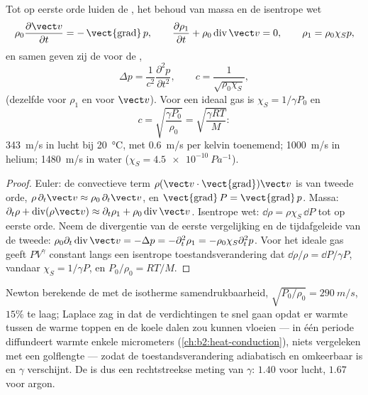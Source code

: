 \begin{theorem}[Geluidsgolven]\label{thm:b2:sound-waves:equation}
Tot op eerste orde luiden de , het behoud van massa en
de isentrope wet
\[
\rho_0\frac{\partial\vect v}{\partial t} = -\operatorname{\vect{grad}}p , \qquad
\frac{\partial\rho_1}{\partial t} + \rho_0\operatorname{div}\vect v = 0 , \qquad
\rho_1 = \rho_0\chi_Sp ,
\]
en samen geven zij de  voor de ,
\[
\Delta p = \frac1{c^2}\frac{\partial^2p}{\partial t^2} , \qquad
c = \frac1{\sqrt{\rho_0\chi_S}} ,
\]
(dezelfde voor $\rho_1$ en voor $\vect v$). Voor een ideaal gas is
$\chi_S =
1/\gamma P_0$ en
\[
c = \sqrt{\frac{\gamma P_0}{\rho_0}} = \sqrt{\frac{\gamma RT}{M}} :
\]
\qty{343}{m/s} in lucht bij \qty{20}{\degreeCelsius}, met \qty{0.6}{m/s} per
kelvin toenemend; \qty{1000}{m/s} in helium; \qty{1480}{m/s} in water
($\chi_S =
\qty{4.5e-10}{Pa^{-1}}$).
\end{theorem}

\begin{proof}
Euler: de convectieve term
$\rho(\vect v\cdot\operatorname{\vect{grad}})\vect v$ is van tweede orde,
$\rho\,\partial_t\vect v \approx \rho_0\,\partial_t\vect v$, en
$\operatorname{\vect{grad}}P = \operatorname{\vect{grad}}p$. Massa:
$\partial_t\rho +
\operatorname{div}(\rho\vect v) \approx \partial_t\rho_1 + \rho_0\operatorname{div}\vect v$.
Isentrope wet: $\dd\rho = \rho\chi_S\,\dd P$ tot op eerste orde. Neem de
divergentie van de eerste vergelijking en de tijdafgeleide van de tweede:
$\rho_0\partial_t\operatorname{div}\vect v = -\Delta p = -\partial_t^2\rho_1 = -\rho_0\chi_S
\partial_t^2p$.
Voor het ideale gas geeft $PV^\gamma$ constant langs een isentrope
toestandsverandering dat $\dd\rho/\rho = \dd P/\gamma P$, vandaar
$\chi_S = 1/\gamma P$, en $P_0/\rho_0 = RT/M$.
\end{proof}

\begin{remark}\label{rem:b2:sound-waves:laplace}
Newton berekende de  met de isotherme samendrukbaarheid,
$\sqrt{P_0/\rho_0} = \qty{290}{m/s}$, $15\%$ te laag; Laplace zag in dat de
verdichtingen te snel gaan opdat er warmte tussen de warme toppen en de
koele dalen zou kunnen vloeien --- in één periode diffundeert warmte enkele
micrometers (\cref{ch:b2:heat-conduction}), niets vergeleken met een
golflengte --- zodat de toestandsverandering adiabatisch en omkeerbaar is en
$\gamma$ verschijnt. De  is dus een rechtstreekse meting van
$\gamma$: $1.40$ voor lucht, $1.67$ voor argon.
\end{remark}

